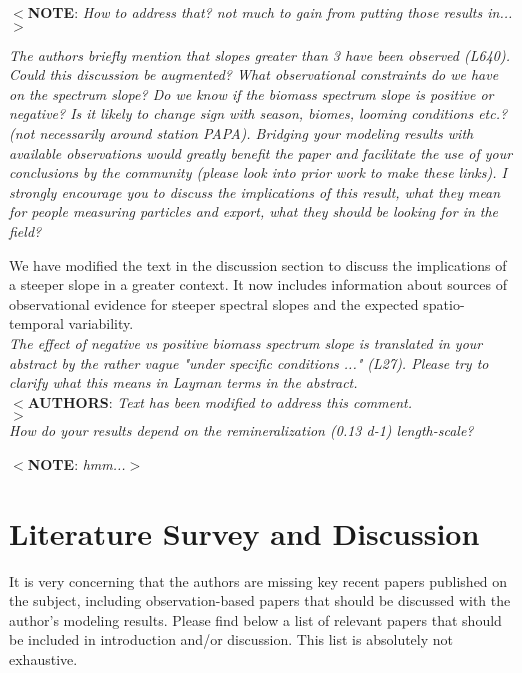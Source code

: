 \documentclass[12pt,letter]{article}
\newcommand{\note}[1]{\color{red}$<$\textbf{NOTE}: \textit{#1}$>$\color{black}}
\newcommand{\rep}[1]{\color{blue}$<$\textbf{AUTHORS}: \textit{#1}$>$\color{black}\\}
\begin{document}
\note{How to address that? not much to gain from putting those results in...\\}

\textit{The authors briefly mention that slopes greater than 3 have been observed (L640). Could this discussion be augmented? What observational constraints do we have on the spectrum slope? Do we know if the biomass spectrum slope is positive or negative? Is it likely to change sign with season, biomes, looming conditions etc.? (not necessarily around station PAPA). Bridging your modeling results with available observations would greatly benefit the paper and facilitate the use of your conclusions by the community (please look into prior work to make these links). I strongly encourage you to discuss the implications of this result, what they mean for people measuring particles and export, what they should be looking for in the field?\\}

We have modified the text in the discussion section to discuss the implications of a steeper slope in a greater context. It now includes information about sources of observational evidence for steeper spectral slopes and the expected spatio-temporal variability.\\
	
\textit{The effect of negative vs positive biomass spectrum slope is translated in your abstract by the rather vague "under specific conditions ..." (L27). Please try to clarify what this means in Layman terms in the abstract.\\
}
\rep{Text has been modified to address this comment.\\}	

\textit{How do your results depend on the remineralization (0.13 d-1) length-scale? \\}

\note{hmm...}

\section*{Literature Survey and Discussion}
It is very concerning that the authors are missing key recent papers published on the subject, including observation-based papers that should be discussed with the author's modeling results. Please find below a list of relevant papers that should be included in introduction and/or discussion. This list is absolutely not exhaustive. 
\end{document}
